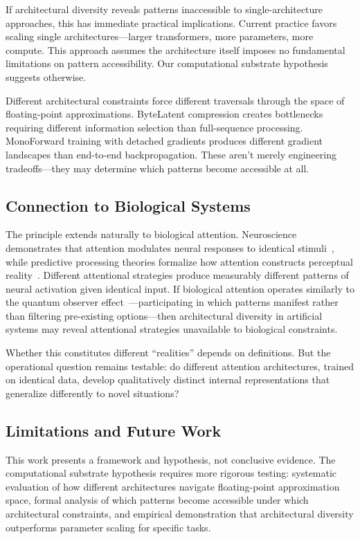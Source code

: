 \documentclass{article}
\begin{document}
If architectural diversity reveals patterns inaccessible to single-architecture approaches, this has immediate practical implications. Current practice favors scaling single architectures—larger transformers, more parameters, more compute. This approach assumes the architecture itself imposes no fundamental limitations on pattern accessibility. Our computational substrate hypothesis suggests otherwise.

Different architectural constraints force different traversals through the space of floating-point approximations. ByteLatent compression creates bottlenecks requiring different information selection than full-sequence processing. MonoForward training with detached gradients produces different gradient landscapes than end-to-end backpropagation. These aren't merely engineering tradeoffs—they may determine which patterns become accessible at all.

\subsection{Connection to Biological Systems}

The principle extends naturally to biological attention. Neuroscience demonstrates that attention modulates neural responses to identical stimuli~\cite{treue1996attentional,kastner2000mechanisms}, while predictive processing theories formalize how attention constructs perceptual reality~\cite{friston2010free,clark2013whatever}. Different attentional strategies produce measurably different patterns of neural activation given identical input. If biological attention operates similarly to the quantum observer effect~\cite{heisenberg1927uncertainty}—participating in which patterns manifest rather than filtering pre-existing options—then architectural diversity in artificial systems may reveal attentional strategies unavailable to biological constraints.

Whether this constitutes different ``realities'' depends on definitions. But the operational question remains testable: do different attention architectures, trained on identical data, develop qualitatively distinct internal representations that generalize differently to novel situations?

\subsection{Limitations and Future Work}

This work presents a framework and hypothesis, not conclusive evidence. The computational substrate hypothesis requires more rigorous testing: systematic evaluation of how different architectures navigate floating-point approximation space, formal analysis of which patterns become accessible under which architectural constraints, and empirical demonstration that architectural diversity outperforms parameter scaling for specific tasks.
\end{document}
